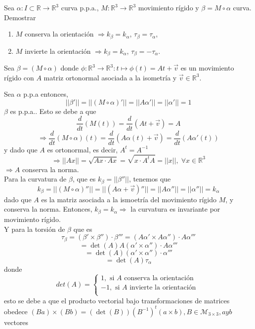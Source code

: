 
\begin{ejr}[35]
  Sea $\alpha  : I \subset \mathbb{R} \to \mathbb{R}^{3}$ curva p.p.a., $M: \mathbb{R}^3 \to \mathbb{R}^3$ movimiento rígido y $\beta = M \circ \alpha$ curva. Demostrar
  \begin{enumerate}[label=(\roman*)]
    \item $M$ conserva la orientación $\Rightarrow k_{\beta} = k_{\alpha}$, $\tau_{\beta} = \tau_{\alpha}$,
    \item $M$ invierte la orientación $\Rightarrow k_{\beta} = k_{\alpha}$, $\tau_{\beta} = - \tau_{\alpha}$.
  \end{enumerate}
\end{ejr}

\begin{sol}[35]
  Sea $\beta = (M  \circ \alpha)$ donde $\phi: \mathbb{R}^3 \to \mathbb{R}^3 : t \mapsto \phi(t) = At + \vec{v}$ es un movimiento rígido con $A$ matriz ortonormal asociada a la isometría y $\vec{v} \in \mathbb{R}^3$.
  
  Sea $\alpha$ p.p.a entonces,
  \[ 
    ||\beta'|| = ||(M \circ \alpha )'|| = ||A \alpha'|| = ||\alpha'|| = 1
  \] 
  $\beta$ es p.p.a.. Esto se debe a que
  \[ 
    \frac{d}{dt}(M(t)) = \frac{d}{dt}(At + \vec{v}) = A
  \]
  \[ 
    \Rightarrow \frac{d{}}{d{t}}(M \circ \alpha)(t) = \frac{d{}}{d{t}}(A \alpha(t) + \vec{v}) = \frac{d{}}{d{t}}(A \alpha'(t))
  \] 
  y dado que $A$ es ortonormal, es decir, $A^{t} = A^{-1}$
  \[
    \Rightarrow ||A x|| = \sqrt{ Ax \cdot Ax } = \sqrt{ x \cdot A^{t}A } = ||x||, \; \forall x \in \mathbb{R}^{3}
  \]
  $\Rightarrow A$ conserva la norma. \\


  Para la curvatura de $\beta$, que es $k_{\beta} = ||\beta''||$, tenemos que
  \[ 
    k_{\beta} = ||(M \circ \alpha)''|| = ||(A \alpha + \vec{v})''|| = ||A \alpha''|| = ||\alpha''|| =  k_{\alpha}
  \]
  dado que $A$ es la matriz asociada a la ismoetría del movimiento rígido $M$, y conserva la norma. Entonces, $k_{\beta} = k_{\alpha} \Rightarrow$ la curvatura es invariante por movimiento rígido.  \\

  Y para la torsión de $\beta$ que es
  \[ 
   \tau_{\beta} = (\beta ' \times \beta '') \cdot \beta''' = (A \alpha' \times A \alpha'') \cdot A \alpha'''
  \] 
  \[ 
    = \det(A) A (\alpha' \times \alpha'') \cdot A \alpha'''
  \] 
  \[ 
    = \det(A) (\alpha' \times \alpha'') \cdot \alpha'''
  \] 
  \[ 
    = \det(A) \tau_{\alpha}
  \] 
  donde
  \[ 
     det(A) =
    \begin{cases}
     1, \text{ si $A$ conserva la orientación }\\
     -1, \text{ si $A$ invierte la orientación }\\
    \end{cases} 
  \] 
  esto se debe a que el producto vectorial bajo transformaciones de matrices obedece $(Ba) \times (Bb) = (\det(B))(B^{-1})^t (a \times b), B \in \mathcal{M}_{3 \times 3}, a y b$ vectores


\end{sol}
